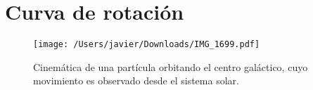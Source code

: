 \documentclass[letterpaper,oneside]{article}
\begin{document}
\section{Curva de rotación}








\begin{figure}[H]
    \centering
    \texttt{[image: /Users/javier/Downloads/IMG\_1699.pdf]}
    \caption{Cinemática de una partícula orbitando el centro galáctico, cuyo movimiento es observado desde el sistema solar.}
    \label{fig:mecanica}
\end{figure}
\end{document}
